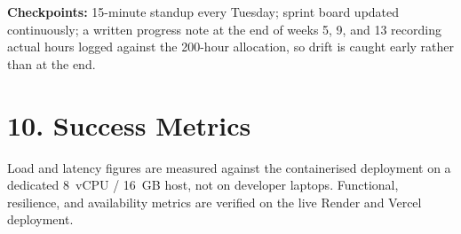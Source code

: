 \documentclass[11pt, a4paper]{article}
\newcommand{\secgap}{\vspace{0.06in}}
\begin{document}
\medskip
\noindent\textbf{Checkpoints:} 15-minute standup every Tuesday; sprint board updated
continuously; a written progress note at the end of weeks 5, 9, and 13 recording actual
hours logged against the 200-hour allocation, so drift is caught early rather than at the
end.

\secgap
\section*{10. Success Metrics}

Load and latency figures are measured against the containerised deployment on a dedicated
8~vCPU / 16~GB host, not on developer laptops. Functional, resilience, and availability
metrics are verified on the live Render and Vercel deployment.
\end{document}
